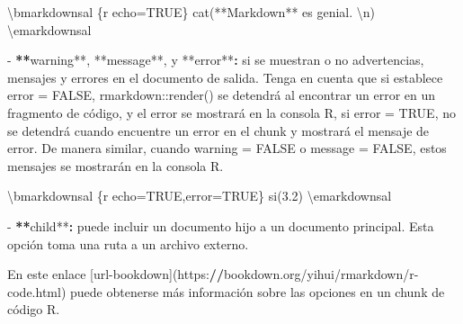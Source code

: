 \documentclass[11pt,a4paper,oneside,]{article}
\newenvironment{Shaded}{\begin{snugshade}}{\end{snugshade}}
\newcommand{\AttributeTok}[1]{\textcolor[rgb]{0.77,0.63,0.00}{#1}}
\newcommand{\ErrorTok}[1]{\textcolor[rgb]{0.64,0.00,0.00}{\textbf{#1}}}
\newcommand{\NormalTok}[1]{#1}
\newcommand{\SpecialCharTok}[1]{\textcolor[rgb]{0.00,0.00,0.00}{#1}}
\newcommand{\StringTok}[1]{\textcolor[rgb]{0.31,0.60,0.02}{#1}}
\numberwithin{dummy}{section}
\theoremstyle{ocrenumbox}
\theoremstyle{blacknumex}
\theoremstyle{blacknumbox}
\theoremstyle{ocrenum}
\theoremstyle{ocrenum}
\begin{document}
\begin{Shaded}
\begin{Highlighting}[numbers=left,,]
\NormalTok{        \textbackslash{}bmarkdownsal}
        \StringTok{\textasciigrave{}\textasciigrave{}\textasciigrave{}}\AttributeTok{\{r echo=TRUE\}}
\AttributeTok{        cat(\textquotesingle{}**Markdown** es genial. }\SpecialCharTok{\textbackslash{}n}\AttributeTok{\textquotesingle{})}
\AttributeTok{        }\StringTok{\textasciigrave{}\textasciigrave{}\textasciigrave{}}
\NormalTok{        \textbackslash{}emarkdownsal}
        
\SpecialCharTok{{-}} \ErrorTok{**}\NormalTok{warning}\SpecialCharTok{**}\NormalTok{, }\SpecialCharTok{**}\NormalTok{message}\SpecialCharTok{**}\NormalTok{, y }\SpecialCharTok{**}\NormalTok{error}\SpecialCharTok{**}\ErrorTok{:}\NormalTok{ si se muestran o no advertencias, mensajes y errores en el documento de salida. Tenga en cuenta que si establece }\StringTok{\textasciigrave{}}\AttributeTok{error = FALSE}\StringTok{\textasciigrave{}}\NormalTok{, }\StringTok{\textasciigrave{}}\AttributeTok{rmarkdown::render()}\StringTok{\textasciigrave{}}\NormalTok{ se detendrá al encontrar un error en un fragmento de código, y el error se mostrará en la consola R, si }\StringTok{\textasciigrave{}}\AttributeTok{error = TRUE}\StringTok{\textasciigrave{}}\NormalTok{, no se detendrá cuando encuentre un error en el chunk y mostrará el mensaje de error. De manera similar, cuando }\StringTok{\textasciigrave{}}\AttributeTok{warning = FALSE}\StringTok{\textasciigrave{}}\NormalTok{ o }\StringTok{\textasciigrave{}}\AttributeTok{message = FALSE}\StringTok{\textasciigrave{}}\NormalTok{, estos mensajes se mostrarán en la consola R.}

\NormalTok{    \textbackslash{}bmarkdownsal}
    \StringTok{\textasciigrave{}\textasciigrave{}\textasciigrave{}}\AttributeTok{\{r echo=TRUE,error=TRUE\}}
\AttributeTok{    si(3.2)}
\AttributeTok{    }\StringTok{\textasciigrave{}\textasciigrave{}\textasciigrave{}}
\NormalTok{    \textbackslash{}emarkdownsal}
    
\SpecialCharTok{{-}} \ErrorTok{**}\NormalTok{child}\SpecialCharTok{**}\ErrorTok{:}\NormalTok{ puede incluir un documento hijo a un documento principal. Esta opción toma una ruta a un archivo externo.}

\NormalTok{En este enlace [url}\SpecialCharTok{{-}}\NormalTok{bookdown](https}\SpecialCharTok{:}\ErrorTok{//}\NormalTok{bookdown.org}\SpecialCharTok{/}\NormalTok{yihui}\SpecialCharTok{/}\NormalTok{rmarkdown}\SpecialCharTok{/}\NormalTok{r}\SpecialCharTok{{-}}\NormalTok{code.html) puede obtenerse más información sobre las opciones en un chunk de código R.}




\end{Highlighting}
\end{Shaded}
\end{document}
